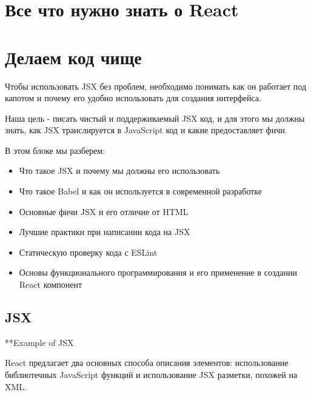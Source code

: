 \documentclass[12pt]{book}
\begin{document}

\chapter{Все что нужно знать о React}

\chapter{Делаем код чище}

Чтобы использовать JSX без проблем, необходимо понимать как он работает под капотом и почему его удобно использовать для создания интерфейса.

Наша цель - писать чистый и поддерживаемый JSX код, и для этого мы должны знать, как JSX транслируется в JavaScript код и какие предоставляет фичи.

В этом блоке мы разберем:

\begin{itemize}
  \item Что такое JSX и почему мы должны его использовать
  \item Что такое Babel и как он используется в современной разработке
  \item Основные фичи JSX и его отличие от HTML
  \item Лучшие практики при написании кода на JSX
  \item Статическую проверку кода с ESLint 
  \item Основы функционального программирования и его применение в создании React компонент
\end{itemize}


\section{JSX}

**Example of JSX

React предлагает два основных способа описания элементов: использование библиотечных JavaScript функций и использование JSX разметки, похожей на XML. 
\end{document}
